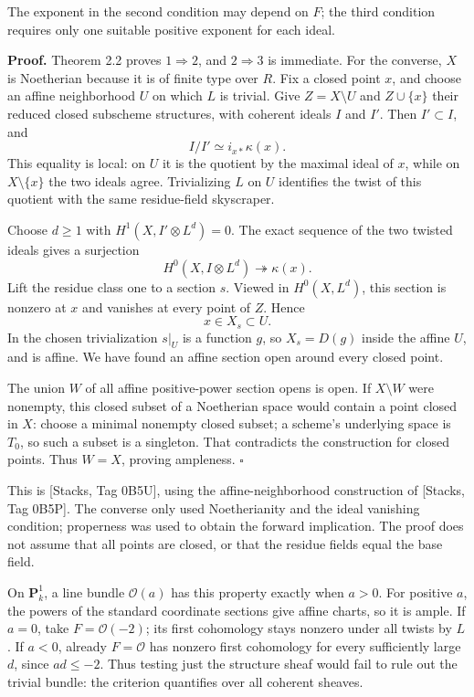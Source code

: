 \documentclass[11pt]{article}
\begin{document}
The exponent in the second condition may depend on \(F\); the third
condition requires only one suitable positive exponent for each ideal.

\textbf{Proof.} Theorem 2.2 proves \(1\Rightarrow2\), and
\(2\Rightarrow3\) is immediate. For the converse, \(X\) is Noetherian
because it is of finite type over \(R\). Fix a closed point \(x\), and
choose an affine neighborhood \(U\) on which \(L\) is trivial. Give
\(Z=X\setminus U\) and \(Z\cup\{x\}\) their reduced closed subscheme
structures, with coherent ideals \(I\) and \(I'\). Then \(I'\subset I\),
and \[
I/I'\simeq i_{x*}\kappa(x).
\] This equality is local: on \(U\) it is the quotient by the maximal
ideal of \(x\), while on \(X\setminus\{x\}\) the two ideals agree.
Trivializing \(L\) on \(U\) identifies the twist of this quotient with
the same residue-field skyscraper.

Choose \(d\ge1\) with \(H^1(X,I'\otimes L^d)=0\). The exact sequence of
the two twisted ideals gives a surjection \[
H^0(X,I\otimes L^d)\twoheadrightarrow\kappa(x).
\] Lift the residue class one to a section \(s\). Viewed in
\(H^0(X,L^d)\), this section is nonzero at \(x\) and vanishes at every
point of \(Z\). Hence \[
x\in X_s\subset U.
\] In the chosen trivialization \(s|_U\) is a function \(g\), so
\(X_s=D(g)\) inside the affine \(U\), and is affine. We have found an
affine section open around every closed point.

The union \(W\) of all affine positive-power section opens is open. If
\(X\setminus W\) were nonempty, this closed subset of a Noetherian space
would contain a point closed in \(X\): choose a minimal nonempty closed
subset; a scheme's underlying space is \(T_0\), so such a subset is a
singleton. That contradicts the construction for closed points. Thus
\(W=X\), proving ampleness. \(\square\)

This is {[}Stacks, Tag 0B5U{]}, using the affine-neighborhood
construction of {[}Stacks, Tag 0B5P{]}. The converse only used
Noetherianity and the ideal vanishing condition; properness was used to
obtain the forward implication. The proof does not assume that all
points are closed, or that the residue fields equal the base field.

On \(\mathbf P_k^1\), a line bundle \(\mathcal O(a)\) has this property
exactly when \(a>0\). For positive \(a\), the powers of the standard
coordinate sections give affine charts, so it is ample. If \(a=0\), take
\(F=\mathcal O(-2)\); its first cohomology stays nonzero under all
twists by \(L\). If \(a<0\), already \(F=\mathcal O\) has nonzero first
cohomology for every sufficiently large \(d\), since \(ad\le-2\). Thus
testing just the structure sheaf would fail to rule out the trivial
bundle: the criterion quantifies over all coherent sheaves.
\end{document}
